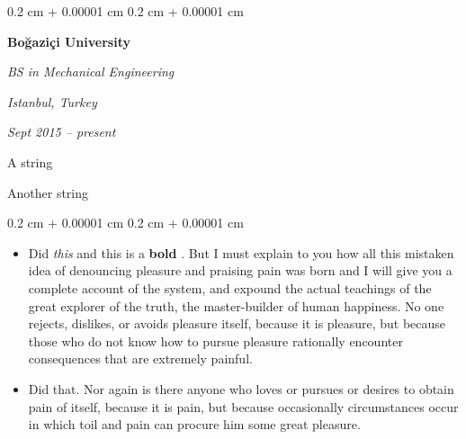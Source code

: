 \documentclass[10pt, letterpaper]{article}
\newenvironment{summary}{
    \begin{description}[
        topsep=0.10 cm,
        parsep=0.10 cm,
        partopsep=0pt,
        itemsep=0pt,
        leftmargin=0.4 cm + 10pt
    ]
}{
    \end{description}
} %
\newenvironment{highlights}{
    \begin{itemize}[
        topsep=0.10 cm,
        parsep=0.10 cm,
        partopsep=0pt,
        itemsep=0pt,
        leftmargin=0.4 cm + 10pt
    ]
}{
    \end{itemize}
} %
\newenvironment{onecolentry}{
    \begin{adjustwidth}{
        0.2 cm + 0.00001 cm
    }{
        0.2 cm + 0.00001 cm
    }
}{
    \end{adjustwidth}
} %
\newenvironment{twocolentry}[2][]{
    \onecolentry
    \def\secondColumn{#2}
    \setcolumnwidth{\fill, 4.5 cm}
    \begin{paracol}{2}
}{
    \switchcolumn \raggedleft \secondColumn
    \end{paracol}
    \endonecolentry
} %
\let\hrefWithoutArrow\href
\renewcommand{\href}[2]{\hrefWithoutArrow{#1}{\ifthenelse{\equal{#2}{}}{ }{#2 }\raisebox{.15ex}{\footnotesize \faExternalLink*}}}
\begin{document}
        \begin{twocolentry}{
        \textit{Istanbul, Turkey}    
            
        \textit{Sept 2015 – present}}
            \textbf{Boğaziçi University}

            \textit{BS in Mechanical Engineering}
        \end{twocolentry}
            \begin{summary}
                \item A string
                \item Another string
            \end{summary}
        \vspace{0.10 cm}
        \begin{onecolentry}
            \begin{highlights}
                \item Did \textit{this} and this is a \textbf{bold} \href{https://example.com}{link}. But I must explain to you how all this mistaken idea of denouncing pleasure and praising pain was born and I will give you a complete account of the system, and expound the actual teachings of the great explorer of the truth, the master-builder of human happiness. No one rejects, dislikes, or avoids pleasure itself, because it is pleasure, but because those who do not know how to pursue pleasure rationally encounter consequences that are extremely painful.
                \item Did that. Nor again is there anyone who loves or pursues or desires to obtain pain of itself, because it is pain, but because occasionally circumstances occur in which toil and pain can procure him some great pleasure.
            \end{highlights}
        \end{onecolentry}


        \vspace{0.2 cm}
\end{document}
